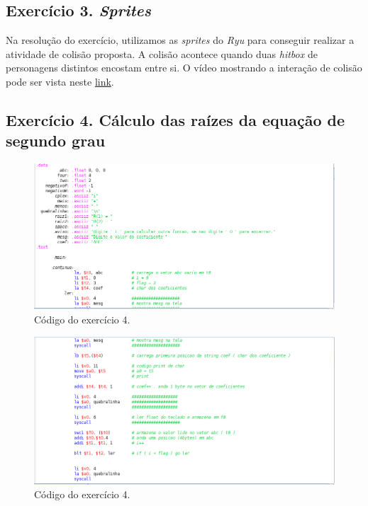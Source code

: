 \documentclass[12pt]{article}
\begin{document}
\subsection{Exercício 3. \textit{Sprites}}
\label{subsec:sprites}

Na resolução do exercício, utilizamos as \textit{sprites} do \textit{Ryu} para conseguir realizar a atividade de colisão proposta. A colisão acontece quando duas \textit{hitbox} de personagens distintos encostam entre si. O vídeo mostrando a interação de colisão pode ser vista neste \href{https://www.youtube.com/watch?v=kbTLQQuw6RA}{link}.


\subsection{Exercício 4. Cálculo das raízes da equação de segundo grau}
\label{subsec:raizes}

\begin{figure}[H]
	\centering
	\includegraphics[width=1\textwidth]{EX_4_1.png}
	\caption{Código do exercício 4.}
	\label{fig:hilo1}
\end{figure}

\begin{figure}[H]
	\centering
	\includegraphics[width=1\textwidth]{EX_4_2.png}
	\caption{Código do exercício 4.}
	\label{fig:hilo2}
\end{figure}
\end{document}
